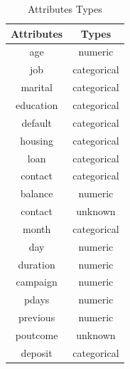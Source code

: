 \documentclass[12pt]{article}
\begin{document}
\begin{table}[h!]
	\centering
	\begin{tabular}{|c|c|}
			\hline
		\textbf{Attributes}& \textbf{Types}\\
		\hline
			\hline
	age	&numeric\\
		\hline
	job	&categorical\\
		\hline
	marital&	categorical\\
		\hline
	education&	categorical\\
		\hline
	default	&categorical\\
		\hline
	housing	&categorical\\
		\hline
	loan	&categorical\\
		\hline
	contact	&categorical\\
		\hline
	balance	&numeric\\
		\hline
	contact	&unknown\\
		\hline
	month&	categorical\\
		\hline
	day	&numeric\\
	    \hline
	duration&	numeric\\
		\hline
	campaign&	numeric\\
		\hline
	pdays	&numeric\\
		\hline
	previous&	numeric\\
		\hline
	poutcome	&unknown\\
		\hline
	deposit&	categorical\\
		\hline
	\end{tabular}

	\caption{Attributes Types}
\end{table}

\newpage
\end{document}
